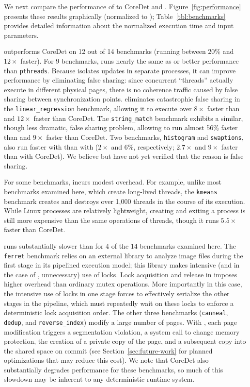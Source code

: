 We next compare the performance of \dthreads{} to CoreDet
and \pthreads{}. Figure~\ref{fig:performance} presents these results graphically (normalized to \pthreads{}); Table~\ref{tbl:benchmarks} provides detailed information about the normalized execution time and input parameters.

\dthreads{} outperforms CoreDet on 12 out of 14 benchmarks (running between 20\% and $12\times$ faster). For 9 benchmarks, \dthreads{} runs nearly the same as or better
performance than \texttt{pthreads}. Because \dthreads{} isolates updates in separate processes, it can improve performance by eliminating false sharing: since concurrent ``threads'' actually execute in different physical pages, there is no coherence traffic caused by false sharing between synchronization points. \dthreads{} eliminates catastrophic false sharing in the \texttt{linear\_regression} benchmark, allowing it to execute over $8\times$ faster than \pthreads{} and $12\times$ faster than CoreDet. The \texttt{string\_match} benchmark exhibits a similar, though less dramatic, false sharing problem, allowing \dthreads{} to run almost 56\% faster than \pthreads{} and $9\times$ faster than CoreDet. Two benchmarks, \texttt{histogram} and \texttt{swaptions}, also run faster with \dthreads{} than with \pthreads{} ($2\times$ and $6\%$, respectively; $2.7\times$ and $9\times$ faster than with CoreDet). We believe but have not yet verified that the reason is false sharing.

For some benchmarks, \dthreads{} incurs modest overhead. For example, unlike most benchmarks examined here, which create long-lived threads, the \texttt{kmeans} benchmark creates and destroys over 1,000 threads in the course of its execution. 
While Linux processes are relatively lightweight, creating and exiting a process is still more expensive than the same operations of threads, though it runs $5.5\times$ faster than CoreDet.

\dthreads{} runs substantially slower than \pthreads{} for 4 of the 14 benchmarks examined here. The \texttt{ferret} benchmark relies on an external library to analyze image files during the first stage in its pipelined execution model; this library makes intensive (and in the case of \dthreads{}, unnecessary) use of locks. Lock acquisition and release in \dthreads{} imposes higher overhead than ordinary \pthreads{} mutex operations. More importantly in this case, the intensive use of locks in one stage forces \dthreads{} to effectively serialize the other stages in the pipeline, which must repeatedly wait on these locks to enforce a deterministic lock acquisition order. The other three benchmarks (\texttt{canneal}, \texttt{dedup}, and \texttt{reverse\_index}) modify a large number of pages. With \dthreads{}, each page modification triggers a segmentation violation, a system call to change memory protection, the creation of a private copy of the page, and a subsequent copy into the shared space on commit (see Section~\ref{sec:future-work} for planned optimizations that may reduce this cost). We note that CoreDet also substantially degrades performance for these benchmarks, so much of this slowdown may be inherent to any deterministic runtime system.

